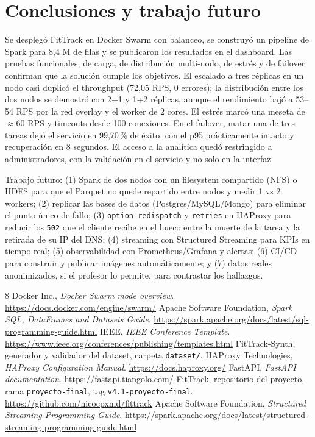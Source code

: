 \documentclass[conference]{IEEEtran}
\begin{document}
\section{Conclusiones y trabajo futuro}
Se desplegó FitTrack en Docker Swarm con balanceo, se construyó un pipeline de Spark para 8,4 M de
filas y se publicaron los resultados en el dashboard. Las pruebas funcionales, de carga, de
distribución multi-nodo, de estrés y de failover confirman que la solución cumple los objetivos. El
escalado a tres réplicas en un nodo casi duplicó el throughput (72,05 RPS, 0 errores); la
distribución entre los dos nodos se demostró con 2+1 y 1+2 réplicas, aunque el rendimiento bajó a
53--54 RPS por la red overlay y el worker de 2 cores. El estrés marcó una meseta de $\approx$60 RPS y
timeouts desde 100 conexiones. En el failover, matar una de tres tareas dejó el servicio en
99,70\,\% de éxito, con el p95 prácticamente intacto y recuperación en 8 segundos. El acceso a la analítica quedó
restringido a administradores, con la validación en el servicio y no solo en la interfaz.

Trabajo futuro: (1) Spark de dos nodos con un filesystem compartido (NFS) o HDFS para que el Parquet
no quede repartido entre nodos y medir 1 vs 2 workers; (2) replicar las bases de datos
(Postgres/MySQL/Mongo) para eliminar el punto único de fallo; (3) \texttt{option redispatch} y
\texttt{retries} en HAProxy para reducir los \texttt{502} que el cliente recibe en el hueco entre la
muerte de la tarea y la retirada de su IP del DNS; (4) streaming con Structured Streaming \cite{streaming}
para KPIs en tiempo real; (5) observabilidad con Prometheus/Grafana y alertas; (6) CI/CD para
construir y publicar imágenes automáticamente; y (7) datos reales anonimizados, si el profesor lo
permite, para contrastar los hallazgos.

\begin{thebibliography}{8}
 Docker Inc., \emph{Docker Swarm mode overview}.
\url{https://docs.docker.com/engine/swarm/}
 Apache Software Foundation, \emph{Spark SQL, DataFrames and Datasets Guide}.
\url{https://spark.apache.org/docs/latest/sql-programming-guide.html}
 IEEE, \emph{IEEE Conference Template}.
\url{https://www.ieee.org/conferences/publishing/templates.html}
 FitTrack-Synth, generador y validador del dataset, carpeta \texttt{dataset/}.
 HAProxy Technologies, \emph{HAProxy Configuration Manual}.
\url{https://docs.haproxy.org/}
 FastAPI, \emph{FastAPI documentation}. \url{https://fastapi.tiangolo.com/}
 FitTrack, repositorio del proyecto, rama \texttt{proyecto-final}, tag
\texttt{v4.1-proyecto-final}. \url{https://github.com/nicocpxmd/fittrack}
 Apache Software Foundation, \emph{Structured Streaming Programming Guide}.
\url{https://spark.apache.org/docs/latest/structured-streaming-programming-guide.html}
\end{thebibliography}
\end{document}
